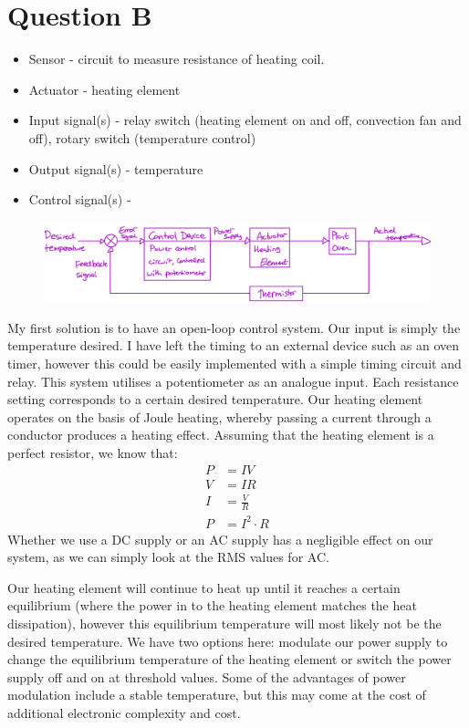 \documentclass[12pt]{article}
\numberwithin{equation}{section}
\begin{document}
\section{Question B}
\begin{itemize}
  \item Sensor - circuit to measure resistance of heating coil.
  \item Actuator - heating element
  \item Input signal(s) - relay switch (heating element on and off, convection fan and off), rotary switch (temperature control)
  \item Output signal(s) - temperature
  \item Control signal(s) - 
\end{itemize}
\begin{figure}[H]
  \centering
  \includegraphics[width=\textwidth]{./img/2-1blockdiagram.png}
\end{figure}
My first solution is to have an open-loop control system. Our input is simply the temperature desired. I have left the timing to an external device such as an oven timer, however this could be easily implemented with a simple timing circuit and relay. This system utilises a potentiometer as an analogue input. Each resistance setting corresponds to a certain desired temperature. Our heating element operates on the basis of Joule heating, whereby passing a current through a conductor produces a heating effect. Assuming that the heating element is a perfect resistor, we know that:
\begin{align}
  P &= IV\\
  V &= IR\\
  I &= \frac{V}{R}\\
  P &= I^2 \cdot R
\end{align}
Whether we use a DC supply or an AC supply has a negligible effect on our system, as we can simply look at the RMS values for AC. 

Our heating element will continue to heat up until it reaches a certain equilibrium (where the power in to the heating element matches the heat dissipation), however this equilibrium temperature will most likely not be the desired temperature. We have two options here: modulate our power supply to change the equilibrium temperature of the heating element or switch the power supply off and on at threshold values. Some of the advantages of power modulation include a stable temperature, but this may come at the cost of additional electronic complexity and cost. 
\end{document}
